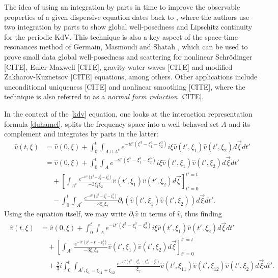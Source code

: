 \documentclass[%
11pt,  reqno]{amsart}
\newcommand{\5}{\textup{V}}
\theoremstyle{remark}
\numberwithin{equation}{section}
\numberwithin{theorem}{section}
\begin{document}
	The idea of using an integration by parts in time to improve the observable properties of a given dispersive equation dates back to \cite{bit}, where the authors use two integration by parts to show global well-posedness and Lipschitz continuity for the periodic KdV. This technique is also a key aspect of the space-time resonances method of Germain, Masmoudi and Shatah \cite{GMS}, which can be used to prove small data global well-posedness and scattering for nonlinear Schrödinger [CITE], Euler-Maxwell [CITE], gravity water waves [CITE] and modified Zakharov-Kuznetsov [CITE] equations, among others. Other applications include unconditional uniqueness [CITE] and nonlinear smoothing [CITE], where the technique is also referred to as a \emph{normal form reduction} [CITE].
	
	In the context of the \eqref{kdv} equation, one looks at the interaction representation formula \eqref{duhamel}, splits the frequency space into a well-behaved set $A$ and its complement and integrates by parts in the latter:
	\begin{align}
		\widehat{v}(t,\xi)&=\widehat{v}(0,\xi) + \int_0^t \int_{A\cup A^c}e^{-it' (\xi^3 -
			\xi_1^3 - \xi_2^3) } i\xi \widehat{v}(t', \xi_1) \widehat{v}(t',\xi_2) d\vec{\xi} dt'
		\\&\label{NF00}=\widehat{v}(0,\xi) + \int_0^t \int_{A}e^{-it' (\xi^3 -
			\xi_1^3 - \xi_2^3) } i\xi \widehat{v}(t', \xi_1) \widehat{v}(t',\xi_2) d\vec{\xi} dt'\\&\quad + \left[ \int_{A^c}\frac{e^{-it' (\xi^3 -
				\xi_1^3 - \xi_2^3) }}{-3\xi_1\xi_2}  \widehat{v}(t', \xi_1) \widehat{v}(t',\xi_2) d\vec{\xi}\right]_{t'=0}^{t'=t} \\&\quad- \int_0^t\int_{A^c}\frac{e^{-it' (\xi^3 -
				\xi_1^3 - \xi_2^3) }}{-3\xi_1\xi_2}  \partial_t\left(\widehat{v}(t', \xi_1) \widehat{v}(t',\xi_2)\right) d\vec{\xi}dt'
		.
	\end{align}
	Using the equation itself, we may write $\partial_t\widehat{v}$ in terms of $\widehat{v}$, thus finding
	\begin{align}
		\label{NF0}
		\begin{split}
			\widehat{v}(t,\xi)&=\widehat{v}(0,\xi) + \int_0^t \int_{A}e^{-it' (\xi^3 -
				\xi_1^3 - \xi_2^3) } i\xi \widehat{v}(t', \xi_1) \widehat{v}(t',\xi_2) d\vec{\xi} dt'\\&\quad + \left[ \int_{A^c}\frac{e^{-it' (\xi^3 -
					\xi_1^3 - \xi_2^3) }}{-3\xi_1\xi_2}  \widehat{v}(t', \xi_1) \widehat{v}(t',\xi_2) d\vec{\xi}\right]_{t'=0}^{t'=t} \\
			&\quad
			+\frac23 i
			\int_0^t\int_{A^c, \xi_1=\xi_{11}+\xi_{12}}\frac{e^{-it' (\xi^3 -
					\xi_{11}^3-
					\xi_{12}^3 - \xi_2^3) }}{\xi_2}  \widehat{v}(t', \xi_{11})\widehat{v}(t', \xi_{12}) \widehat{v}(t',\xi_2) d\vec{\xi}dt'
			.
		\end{split}
	\end{align}
\end{document}
